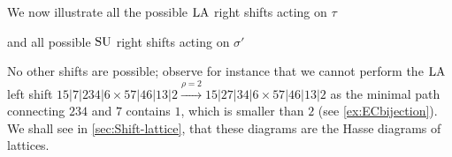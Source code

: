 \begin{example}
\begin{center}
{\small
{}
\qquad
{}
}
\end{center}
We now illustrate all the possible $\mathrm{LA}$ right shifts acting on $\tau$
\begin{center}
\end{center}
and all possible $\mathrm{SU}$ right shifts acting on $\sigma'$
\begin{center}
\end{center}
No other shifts are possible; observe for instance that we cannot perform the $\mathrm{LA}$ left shift $15|7|234|6 \times 57|46|13|2 \xrightarrow{\rho=2} 15|27|34|6 \times 57|46|13|2$ as the minimal path connecting $234$ and $7$ contains $1$, which is smaller than $2$ (see \cref{ex:ECbijection}).
We shall see in \cref{sec:Shift-lattice}, that these diagrams are the Hasse diagrams of lattices.
\end{example}

